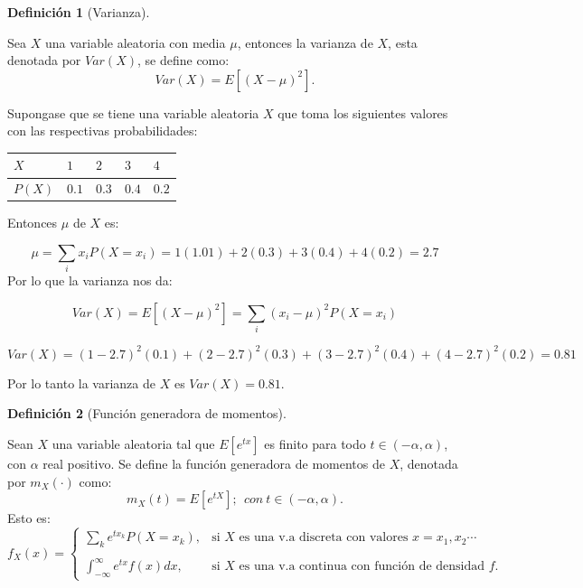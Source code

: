\documentclass[
  us-letterpaper,
]{scrreprt}
\theoremstyle{plain}
\theoremstyle{plain}
\theoremstyle{definition}
\newtheorem{definition}{Definición}[chapter]
\theoremstyle{remark}
\begin{document}
\begin{definition}[Varianza]\protect\hypertarget{def-varianza}{}\label{def-varianza}

Sea \(X\) una variable aleatoria con media \(\mu\), entonces la varianza
de \(X\), esta denotada por \(Var(X)\), se define como:
\[Var(X) = E[(X - \mu)^2].\]

\end{definition}

\begin{tcolorbox}[enhanced jigsaw, titlerule=0mm, opacityback=0, coltitle=black, bottomrule=.15mm, colbacktitle=quarto-callout-caution-color!10!white, toprule=.15mm, colback=white, arc=.35mm, colframe=quarto-callout-caution-color-frame, leftrule=.75mm, bottomtitle=1mm, left=2mm, toptitle=1mm, opacitybacktitle=0.6, breakable, title={Ejemplo (\textbf{\emph{Varianza}})}, rightrule=.15mm]

Supongase que se tiene una variable aleatoria \(X\) que toma los
siguientes valores con las respectivas probabilidades:

\begin{longtable}[]{@{}lllll@{}}
\toprule\noalign{}
\(X\) & \(1\) & \(2\) & \(3\) & \(4\) \\
\midrule\noalign{}
\endhead
\bottomrule\noalign{}
\endlastfoot
\(P(X)\) & \(0.1\) & \(0.3\) & \(0.4\) & \(0.2\) \\
\end{longtable}

Entonces \(\mu\) de \(X\) es:

\[
\mu = \sum_i x_iP(X = x_i) = 1(1.01) + 2(0.3) + 3(0.4)+ 4(0.2) = 2.7
\] Por lo que la varianza nos da:

\[
Var(X) = E[(X - \mu)^2] = \sum_{i}(x_i - \mu)^2 P(X= x_i)
\]

\[
Var(X) = (1- 2.7)^2(0.1) + (2- 2.7)^2(0.3) + (3- 2.7)^2(0.4) + (4- 2.7)^2(0.2) = 0.81
\]

Por lo tanto la varianza de \(X\) es \(Var(X) = 0.81\).

\end{tcolorbox}

\begin{definition}[Función generadora de
momentos]\protect\hypertarget{def-fun_gen_mom}{}\label{def-fun_gen_mom}

Sean \(X\) una variable aleatoria tal que \(E[e^{tx}]\) es finito para
todo \(t \in (-\alpha, \alpha)\), con \(\alpha\) real positivo. Se
define la función generadora de momentos de \(X\), denotada por
\(m_X(\cdot)\) como:
\[m_X(t) = E[e^{tX}]; \ \ con \  t \in (-\alpha, \alpha).\] Esto es:
\[f_X(x) = \left\{ \begin{array}{lcc} \sum_{k} e^{tx_{k}}P(X = x_k), & \text{si $X$ es una v.a discreta con valores $x = x_1, x_2\dotsb$} \\ \\ \int_{-\infty}^{\infty} e^{tx}f(x)dx, & \text{si $X$ es una v.a continua con función de densidad $f$.} \end{array} \right.\]

\end{definition}
\end{document}
